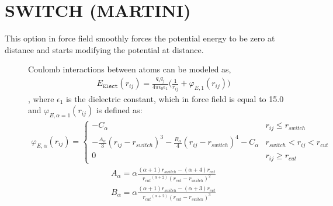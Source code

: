 \documentclass[letterpaper,10pt,english]{sphinxmanual}
\begin{document}
\section{SWITCH (MARTINI)}
\label{\detokenize{electrostatic:switch-martini}}
\sphinxAtStartPar
This option in  force field smoothly forces the potential energy to be zero at  distance and starts modifying the potential at  distance.
\begin{description}
\item[{}] \leavevmode
\sphinxAtStartPar
Coulomb interactions between atoms can be modeled as,
\begin{equation*}
\begin{split}E_{\texttt{Elect}}(r_{ij})=\frac{q_i q_j}{4\pi\epsilon_0\epsilon_1}\bigg(\frac{1}{r_{ij}}+\varphi_{E, 1}(r_{ij})\bigg)\end{split}
\end{equation*}
\sphinxAtStartPar
, where \(\epsilon_1\) is the dielectric constant, which in  force field is equal to 15.0 and \(\varphi_{E, \alpha = 1}(r_{ij})\) is defined as:
\begin{equation*}
\begin{split}\varphi_{E, \alpha}(r_{ij}) =
\begin{cases}
  -C_{\alpha} & r_{ij} \leq r_{switch} \\
  -\frac{A_{\alpha}}{3} (r_{ij} - r_{switch})^3 -\frac{B_{\alpha}}{4} (r_{ij} - r_{switch})^4 - C_{\alpha} & r_{switch} < r_{ij} < r_{cut} \\
  0 & r_{ij} \geq r_{cut}
\end{cases}\end{split}
\end{equation*}\begin{equation*}
\begin{split}A_{\alpha} = \alpha \frac{(\alpha + 1) r_{switch} - (\alpha +4) r_{cut}} {{r_{cut}}^{(\alpha + 2)} {(r_{cut} - r_{switch})}^2}\end{split}
\end{equation*}\begin{equation*}
\begin{split}B_{\alpha} = \alpha \frac{(\alpha + 1) r_{switch} - (\alpha +3) r_{cut}} {{r_{cut}}^{(\alpha + 2)} {(r_{cut} - r_{switch})}^3}\end{split}
\end{equation*}\begin{equation*}

\end{equation*}
\end{description}
\end{document}
